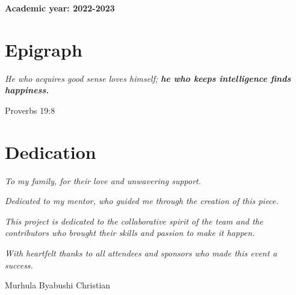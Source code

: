 \documentclass[12pt,a4paper, oneside]{book}
\begin{document}
\begin{titlepage}
\begin {minipage}{0.5 \textwidth }
\begin{flushright}
{\begin{tabbing}
				\end{tabbing} 
			
			}					
			
		\end{flushright}
	\end{minipage}

		\begin{center} 
			\vspace*{1cm}
			\LARGE\textbf{Academic year: 2022-2023}
		\end{center}   
	\end{titlepage}   
\frontmatter 
	\tableofcontents
   \chapter{Epigraph}
	\textit{He who acquires good sense loves himself;
		\textbf{he who keeps intelligence finds happiness.}}
	\begin{center}
		 Proverbs 19:8
	\end{center}

	
	\chapter{Dedication} 
		\textit{To my family, for their love and unwavering support.}
		
		\vspace{0.5cm}
		
		\textit{Dedicated to my mentor, who guided me through the creation of this piece.}
		
		\vspace{0.5cm}
		
		\textit{This project is dedicated to the collaborative spirit of the team and the contributors who brought their skills and passion to make it happen.}
		
		\vspace{0.5cm}
		
		\textit{With heartfelt thanks to all attendees and sponsors who made this event a success.}
		
		
		\vspace{12cm} \begin{flushright}
			Murhula Byabushi Christian
		\end{flushright}
		
\end{document}
